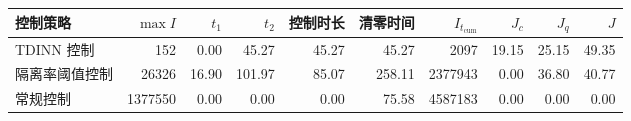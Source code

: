 \begin{tabular}{lrrrrrrrrr}
\toprule
控制策略 & $\max I$ & $t_1$ & $t_2$ & 控制时长 & 清零时间 & $I_{t_{\mathrm{cum}}}$ & $J_c$ & $J_q$ & $J$ \\
\midrule
TDINN 控制 & 152 & 0.00 & 45.27 & 45.27 & 45.27 & 2097 & 19.15 & 25.15 & 49.35 \\
隔离率阈值控制 & 26326 & 16.90 & 101.97 & 85.07 & 258.11 & 2377943 & 0.00 & 36.80 & 40.77 \\
常规控制 & 1377550 & 0.00 & 0.00 & 0.00 & 75.58 & 4587183 & 0.00 & 0.00 & 0.00 \\
\bottomrule
\end{tabular}

